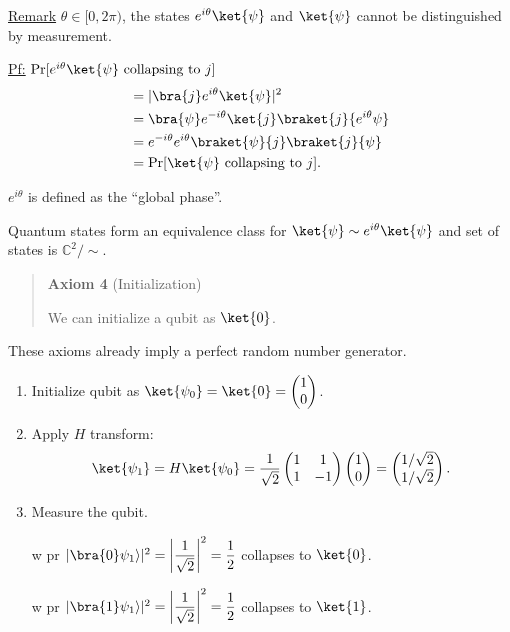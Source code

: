 \documentclass[11pt]{article}
\begin{document}
\underline{Remark} $\theta \in [0,2\pi)$, the states $e^{i\theta}\ket{\psi}$ and $\ket{\psi}$ cannot be distinguished by measurement.

\underline{Pf:} $\Pr[e^{i\theta}\ket{\psi} \text{ collapsing to } j]$
\begin{align*}
&= |\bra{j} e^{i\theta} \ket{\psi}|^2 \\
&= \bra{\psi} e^{-i\theta} \ket{j} \braket{j}{e^{i\theta}\psi} \\
&= e^{-i\theta} e^{i\theta} \braket{\psi}{j}\braket{j}{\psi} \\
&= \Pr[\ket{\psi} \text{ collapsing to } j].
\end{align*}

$e^{i\theta}$ is defined as the ``global phase''.

Quantum states form an equivalence class for $\ket{\psi} \sim e^{i\theta}\ket{\psi}$ and set of states is $\mathbb{C}^2/{\sim}$.

\begin{quote}
\textbf{Axiom 4} (Initialization)

We can initialize a qubit as $\ket{0}$.
\end{quote}

These axioms already imply a perfect random number generator.
\begin{enumerate}
    \item[\textcircled{1}] Initialize qubit as $\ket{\psi_0} = \ket{0} = \begin{pmatrix}1\\0\end{pmatrix}$.
    \item[\textcircled{2}] Apply $H$ transform:
    \[
    \ket{\psi_1} = H\ket{\psi_0} = \frac{1}{\sqrt2}\begin{pmatrix}1&1\\1&-1\end{pmatrix}\begin{pmatrix}1\\0\end{pmatrix} = \begin{pmatrix} 1/\sqrt2 \\ 1/\sqrt2 \end{pmatrix}.
    \]
    \item[\textcircled{3}] Measure the qubit.

    w pr $|\bra{0}\psi_1\rangle|^2 = \left|\dfrac{1}{\sqrt2}\right|^2 = \dfrac12$ collapses to $\ket{0}$.

    w pr $|\bra{1}\psi_1\rangle|^2 = \left|\dfrac{1}{\sqrt2}\right|^2 = \dfrac12$ collapses to $\ket{1}$.
\end{enumerate}
\end{document}
